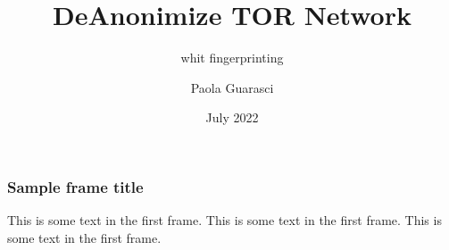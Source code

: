 \documentclass{beamer}
\title[DeAnon Tor]{DeAnonimize TOR Network}
\subtitle[]{whit fingerprinting}
\author[]{Paola Guarasci}
\institute[Unical]{Università della Calabria}
\date[06/2022]{July 2022}
\begin{document}
\frame{\titlepage}

\begin{frame}
\frametitle{Sample frame title}
This is some text in the first frame. This is some text in the first frame. This is some text in the first frame.
\end{frame}
\end{document}
